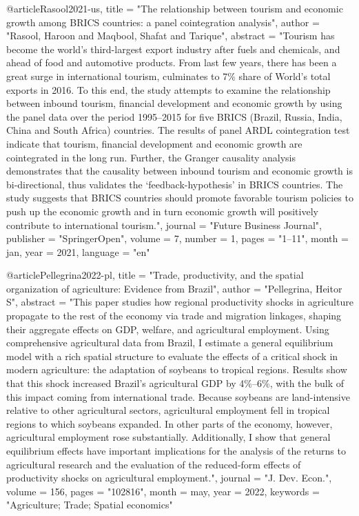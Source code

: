 {@article{Rasool2021-us,
	title     = "The relationship between tourism and economic growth among
	{BRICS} countries: a panel cointegration analysis",
	author    = "Rasool, Haroon and Maqbool, Shafat and {Tarique}",
	abstract  = "Tourism has become the world's third-largest export industry
	after fuels and chemicals, and ahead of food and automotive
	products. From last few years, there has been a great surge in
	international tourism, culminates to 7\% share of World's total
	exports in 2016. To this end, the study attempts to examine the
	relationship between inbound tourism, financial development and
	economic growth by using the panel data over the period
	1995--2015 for five BRICS (Brazil, Russia, India, China and
	South Africa) countries. The results of panel ARDL cointegration
	test indicate that tourism, financial development and economic
	growth are cointegrated in the long run. Further, the Granger
	causality analysis demonstrates that the causality between
	inbound tourism and economic growth is bi-directional, thus
	validates the `feedback-hypothesis' in BRICS countries. The
	study suggests that BRICS countries should promote favorable
	tourism policies to push up the economic growth and in turn
	economic growth will positively contribute to international
	tourism.",
	journal   = "Future Business Journal",
	publisher = "SpringerOpen",
	volume    =  7,
	number    =  1,
	pages     = "1--11",
	month     =  jan,
	year      =  2021,
	language  = "en"
}


@article{Pellegrina2022-pl,
	title    = "Trade, productivity, and the spatial organization of agriculture:
	Evidence from Brazil",
	author   = "Pellegrina, Heitor S",
	abstract = "This paper studies how regional productivity shocks in
	agriculture propagate to the rest of the economy via trade and
	migration linkages, shaping their aggregate effects on GDP,
	welfare, and agricultural employment. Using comprehensive
	agricultural data from Brazil, I estimate a general equilibrium
	model with a rich spatial structure to evaluate the effects of a
	critical shock in modern agriculture: the adaptation of soybeans
	to tropical regions. Results show that this shock increased
	Brazil's agricultural GDP by 4\%--6\%, with the bulk of this
	impact coming from international trade. Because soybeans are
	land-intensive relative to other agricultural sectors,
	agricultural employment fell in tropical regions to which
	soybeans expanded. In other parts of the economy, however,
	agricultural employment rose substantially. Additionally, I show
	that general equilibrium effects have important implications for
	the analysis of the returns to agricultural research and the
	evaluation of the reduced-form effects of productivity shocks on
	agricultural employment.",
	journal  = "J. Dev. Econ.",
	volume   =  156,
	pages    = "102816",
	month    =  may,
	year     =  2022,
	keywords = "Agriculture; Trade; Spatial economics"
}

}
